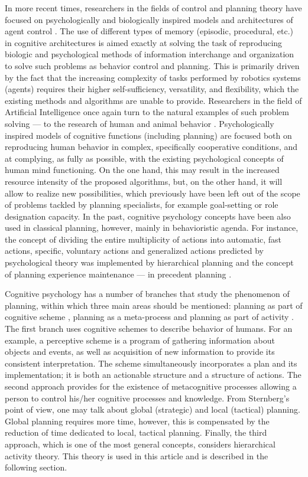 \documentclass[review]{elsarticle}
\begin{document}
In more recent times, researchers in the fields of control and planning theory have focused on psychologically and biologically inspired models and architectures of agent control \cite{Kelley2006,Sun2012a}. The use of different types of memory (episodic, procedural, etc.) in cognitive architectures is aimed exactly at solving the task of reproducing biologic and psychological methods of information interchange and organization to solve such problems as behavior control and planning. This is primarily driven by the fact that the increasing complexity of tasks performed by robotics systems (agents) requires their higher self-sufficiency, versatility, and flexibility, which the existing methods and algorithms are unable to provide. Researchers in the field of Artificial Intelligence once again turn to the natural examples of such problem solving --- to the research of human and animal behavior \cite{Redko2016,Panov2016b}. Psychologically inspired models of cognitive functions (including planning) are focused both on reproducing human behavior in complex, specifically cooperative conditions, and at complying, as fully as possible, with the existing psychological concepts of human mind functioning. On the one hand, this may result in the increased resource intensity of the proposed algorithms, but, on the other hand, it will allow to realize new possibilities, which previously have been left out of the scope of problems tackled by planning specialists, for example goal-setting or role designation capacity. In the past, cognitive psychology concepts have been also used in classical planning, however, mainly in behavioristic agenda. For instance, the concept of dividing the entire multiplicity of actions into automatic, fast actions, specific, voluntary actions and generalized actions predicted by psychological theory \cite{Kahneman2011} was implemented by hierarchical planning and the concept of planning experience maintenance --- in precedent planning \cite{Hammond1990,DeLaRosa2013,Borrajo2015}.

Cognitive psychology has a number of branches that study the phenomenon of planning, within which three main areas should be mentioned: planning as part of cognitive scheme \cite{Neisser1976}, planning as a meta-process \cite{Flavell1979,Sternberg2000} and planning as part of activity \cite{Leontyev2009}. The first branch uses cognitive schemes to describe behavior of humans. For an example, a perceptive scheme is a program of gathering information about objects and events, as well as acquisition of new information to provide its consistent interpretation. The scheme simultaneously incorporates a plan and its implementation; it is both an actionable structure and a structure of actions. The second approach provides for the existence of metacognitive processes allowing a person to control his/her cognitive processes and knowledge. From Sternberg's point of view, one may talk about global (strategic) and local (tactical) planning. Global planning requires more time, however, this is compensated by the reduction of time dedicated to local, tactical planning. Finally, the third approach, which is one of the most general concepts, considers hierarchical activity theory. This theory is used in this article and is described in the following section. 
\end{document}
